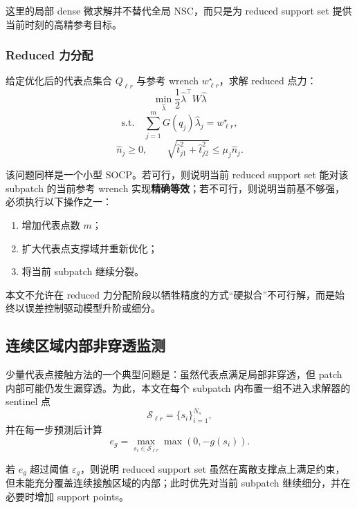 \documentclass[UTF8,a4paper,11pt]{ctexart}
\begin{document}
这里的局部 dense 微求解并不替代全局 NSC，而只是为 reduced support set 提供当前时刻的高精参考目标。

\subsubsection{Reduced 力分配}

给定优化后的代表点集合 $Q_{\ell r}$ 与参考 wrench $w_{\ell r}^\star$，求解 reduced 点力：
\begin{equation}
\min_{\hat{\lambda}}
\frac{1}{2}\hat{\lambda}^\top W \hat{\lambda}
\end{equation}
\begin{equation}
\text{s.t.}\quad
\sum_{j=1}^{m} G(q_j)\hat{\lambda}_j = w_{\ell r}^\star,
\end{equation}
\begin{equation}
\hat{n}_j \ge 0,
\qquad
\sqrt{\hat{t}_{j1}^2+\hat{t}_{j2}^2}\le \mu_j \hat{n}_j.
\end{equation}

该问题同样是一个小型 SOCP。若可行，则说明当前 reduced support set 能对该 subpatch 的当前参考 wrench 实现\textbf{精确等效}；若不可行，则说明当前基不够强，必须执行以下操作之一：
\begin{enumerate}[label=(\arabic*)]
    \item 增加代表点数 $m$；
    \item 扩大代表点支撑域并重新优化；
    \item 将当前 subpatch 继续分裂。
\end{enumerate}

本文不允许在 reduced 力分配阶段以牺牲精度的方式“硬拟合”不可行解，而是始终以误差控制驱动模型升阶或细分。

\subsection{连续区域内部非穿透监测}

少量代表点接触方法的一个典型问题是：虽然代表点满足局部非穿透，但 patch 内部可能仍发生漏穿透。为此，本文在每个 subpatch 内布置一组不进入求解器的 sentinel 点
\begin{equation}
 \mathcal{S}_{\ell r} = \{s_i\}_{i=1}^{N_s},
\end{equation}
并在每一步预测后计算
\begin{equation}
 e_g
 =
 \max_{s_i\in\mathcal{S}_{\ell r}}
 \max(0,-g(s_i)).
\end{equation}

若 $e_g$ 超过阈值 $\varepsilon_g$，则说明 reduced support set 虽然在离散支撑点上满足约束，但未能充分覆盖连续接触区域的内部；此时优先对当前 subpatch 继续细分，并在必要时增加 support points。
\end{document}
